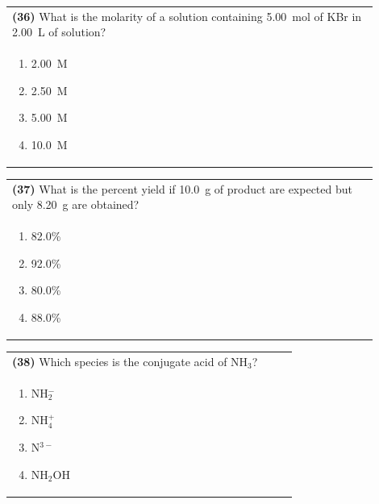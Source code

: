 \documentclass{article}
\begin{document}
\noindent\begin{tabular}{|p{0.9\linewidth}|}
\hline
\textbf{(36)} What is the molarity of a solution containing 5.00~mol of KBr in 2.00~L of solution?\\[0.2cm]
\begin{minipage}[t]{0.85\linewidth}
\begin{enumerate}[label=\alph*.]
\item 2.00~M
\item 2.50~M
\item 5.00~M
\item 10.0~M
\end{enumerate}
\end{minipage}\\[0.2cm]
\hline
\end{tabular}

\noindent\begin{tabular}{|p{0.9\linewidth}|}
\hline
\textbf{(37)} What is the percent yield if 10.0~g of product are expected but only 8.20~g are obtained?\\[0.2cm]

\begin{minipage}[t]{0.85\linewidth}
\begin{enumerate}[label=\alph*.]
\item 82.0\%
\item 92.0\%
\item 80.0\%
\item 88.0\%
\end{enumerate}
\end{minipage}\\[0.2cm]
\hline
\end{tabular}

\noindent\begin{tabular}{|p{0.9\linewidth}|}
\hline
\textbf{(38)} Which species is the conjugate acid of NH$_3$? \\[0.2cm]
\begin{minipage}{0.85\linewidth}
\begin{enumerate}[label=\alph*.]
\item NH$_2^-$ \item NH$_4^+$ \item N$^{3-}$ \item NH$_2$OH
\end{enumerate}
\end{minipage}\\[0.2cm]
\hline
\end{tabular}
\end{document}
